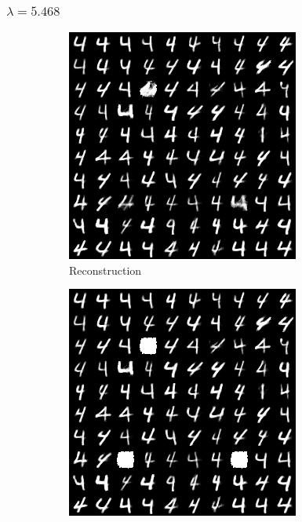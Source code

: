 \documentclass{beamer}
\theoremstyle{plain}
\theoremstyle{definition}
\theoremstyle{remark}
\begin{document}
\begin{frame}
	\frametitle{$\lambda=5.468$}
	\begin{figure}
		\centering
		\begin{subfigure}[b]{0.3\textwidth}
			\centering
			\includegraphics[width=\textwidth]{Images/l21R_5.468.png}
			\caption{Reconstruction}
		\end{subfigure}
		\hfill
		\begin{subfigure}[b]{0.3\textwidth}
			\centering
			\includegraphics[width=\textwidth]{Images/l21L_5.468.png}

\end{subfigure}
\end{figure}
\end{frame}
\end{document}
